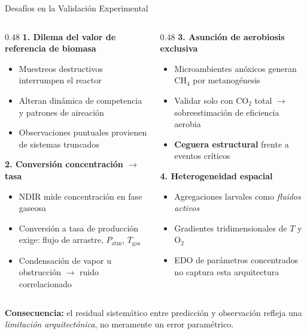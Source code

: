 \documentclass[aspectratio=169, 11pt]{beamer}
\begin{document}
\begin{frame}{Desafíos en la Validación Experimental}
\begin{columns}[T]
\begin{column}{0.48\textwidth}
\textbf{1. Dilema del valor de referencia de biomasa}
\begin{itemize}
    \item Muestreos destructivos interrumpen el reactor
    \item Alteran dinámica de competencia y patrones de aireación
    \item Observaciones puntuales provienen de sistemas truncados
\end{itemize}

\vspace{0.3cm}
\textbf{2. Conversión concentraci\'{o}n $\to$ tasa}
\begin{itemize}
    \item NDIR mide concentración en fase gaseosa
    \item Conversión a tasa de producción exige: flujo de arrastre, $P_{\text{atm}}$, $T_{\text{gas}}$
    \item Condensación de vapor u obstrucción $\rightarrow$ ruido correlacionado
\end{itemize}
\end{column}
\begin{column}{0.48\textwidth}
\textbf{3. Asunción de aerobiosis exclusiva}
\begin{itemize}
    \item Microambientes anóxicos generan CH$_4$ por metanogénesis
    \item Validar solo con CO$_2$ total $\rightarrow$ sobreestimación de eficiencia aerobia
    \item \textbf{Ceguera estructural} frente a eventos críticos
\end{itemize}

\vspace{0.3cm}
\textbf{4. Heterogeneidad espacial}
\begin{itemize}
    \item Agregaciones larvales como \textit{fluidos activos}
    \item Gradientes tridimensionales de $T$ y O$_2$
    \item EDO de parámetros concentrados no captura esta arquitectura
\end{itemize}
\end{column}
\end{columns}
\vfill
\begin{center}
\textcolor{rojoAlerta}{\textbf{Consecuencia:}} el residual sistemático entre predicci\'{o}n y observaci\'{o}n refleja una \textit{limitaci\'{o}n arquitect\'{o}nica}, no meramente un error paramétrico.
\end{center}
\end{frame}
\end{document}
